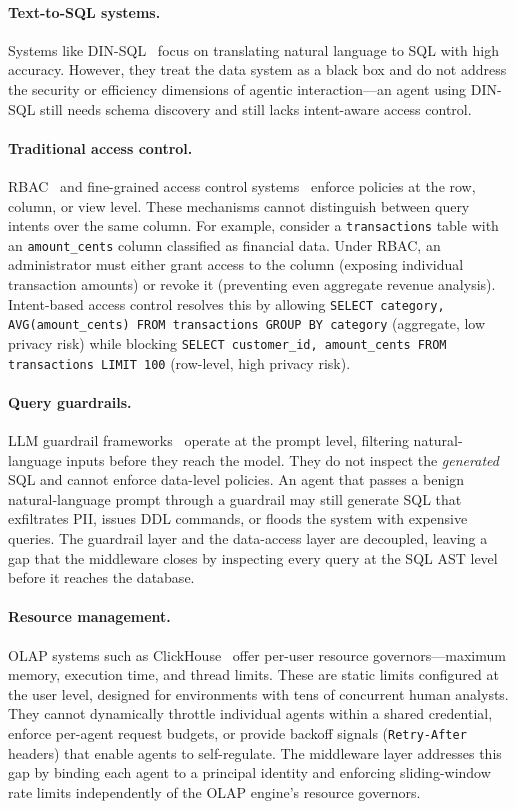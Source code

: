 \documentclass[sigconf, nonacm]{acmart}
\begin{document}
\paragraph{Text-to-SQL systems.}
Systems like DIN-SQL~\cite{pourreza2024dinsql} focus on translating natural
language to SQL with high accuracy. However, they treat the data system as a
black box and do not address the security or efficiency dimensions of agentic
interaction---an agent using DIN-SQL still needs schema discovery and still
lacks intent-aware access control.

\paragraph{Traditional access control.}
RBAC~\cite{sandhu1996rbac} and fine-grained access control
systems~\cite{rizvi2004extending} enforce policies at the row, column, or
view level. These mechanisms cannot distinguish between query intents over the
same column.  For example, consider a \texttt{transactions} table with an
\texttt{amount\_cents} column classified as financial data.  Under RBAC, an
administrator must either grant access to the column (exposing individual
transaction amounts) or revoke it (preventing even aggregate revenue
analysis).  Intent-based access control resolves this by allowing
\texttt{SELECT category, AVG(amount\_cents) FROM transactions GROUP BY
category} (aggregate, low privacy risk) while blocking \texttt{SELECT
customer\_id, amount\_cents FROM transactions LIMIT 100} (row-level, high
privacy risk).

\paragraph{Query guardrails.}
LLM guardrail frameworks~\cite{rebedea2023nemo} operate at the prompt level,
filtering natural-language inputs before they reach the model. They do not
inspect the \emph{generated} SQL and cannot enforce data-level policies.
An agent that passes a benign natural-language prompt through a guardrail may
still generate SQL that exfiltrates PII, issues DDL commands, or floods the
system with expensive queries.  The guardrail layer and the data-access layer
are decoupled, leaving a gap that the middleware closes by inspecting every
query at the SQL AST level before it reaches the database.

\paragraph{Resource management.}
OLAP systems such as ClickHouse~\cite{clickhouse2024} offer per-user resource
governors---maximum memory, execution time, and thread limits.  These are
static limits configured at the user level, designed for environments with tens
of concurrent human analysts.  They cannot dynamically throttle individual
agents within a shared credential, enforce per-agent request budgets, or
provide backoff signals (\texttt{Retry-After} headers) that enable agents to
self-regulate.  The middleware layer addresses this gap by binding each agent
to a principal identity and enforcing sliding-window rate limits independently
of the OLAP engine's resource governors.
\end{document}

